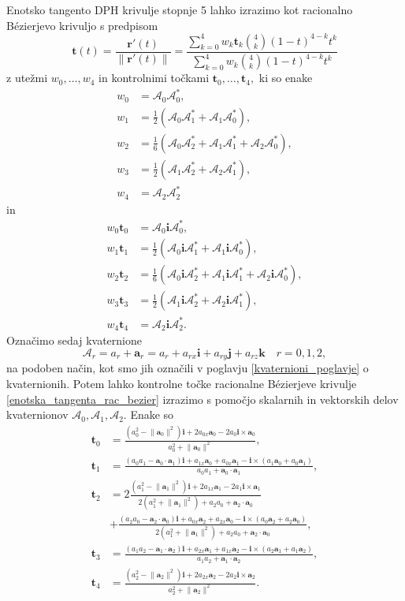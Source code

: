\documentclass[12pt,a4paper,twoside]{article}
\theoremstyle{definition} %
\theoremstyle{plain} %
\theoremstyle{primerstyle}
\numberwithin{equation}{section}  %
\newcommand{\tV}{\mathbf{t}}
\newcommand{\aV}{\mathbf{a}}
\newcommand{\rV}{\mathbf{r}}
\newcommand{\iV}{\mathbf{i}}
\newcommand{\jV}{\mathbf{j}}
\newcommand{\kV}{\mathbf{k}}
\newcommand{\AQ}{\mathcal{A}}
\begin{document}
Enotsko tangento DPH krivulje stopnje 5 lahko izrazimo kot racionalno Bézierjevo krivuljo s predpisom
\begin{equation}
	\label{enotska_tangenta_rac_bezier}
	\tV(t)=\frac{\rV'(t)}{\lVert\rV'(t)\rVert}=\frac{\sum_{k=0}^4w_k\tV_k\binom{4}{k}(1-t)^{4-k}t^k}{\sum_{k=0}^4w_k\binom{4}{k}(1-t)^{4-k}t^k}
\end{equation}
z utežmi $w_0,\dots,w_4$ in kontrolnimi točkami $\tV_0,\dots,\tV_4,$ ki so enake
\begin{align}
	\label{utezi_tangenta}
	w_0&=\AQ_0\AQ_0^*,\nonumber\\
	w_1&=\frac{1}{2}(\AQ_0\AQ_1^*+\AQ_1\AQ_0^*),\nonumber\\
	w_2&=\frac{1}{6}(\AQ_0\AQ_2^*+\AQ_1\AQ_1^*+\AQ_2\AQ_0^*),\\
	w_3&=\frac{1}{2}(\AQ_1\AQ_2^*+\AQ_2\AQ_1^*),\nonumber\\
	w_4&=\AQ_2\AQ_2^*\nonumber
\end{align}
in
\begin{align}
	\label{utezene_kontrolne_tangenta}
	w_0\tV_0&=\AQ_0\iV\AQ_0^*,\nonumber\\
	w_1\tV_1&=\frac{1}{2}(\AQ_0\iV\AQ_1^*+\AQ_1\iV\AQ_0^*),\nonumber\\
	w_2\tV_2&=\frac{1}{6}(\AQ_0\iV\AQ_2^*+\AQ_1\iV\AQ_1^*+\AQ_2\iV\AQ_0^*),\\
	w_3\tV_3&=\frac{1}{2}(\AQ_1\iV\AQ_2^*+\AQ_2\iV\AQ_1^*),\nonumber\\
	w_4\tV_4&=\AQ_2\iV\AQ_2^*.\nonumber
\end{align}
Označimo sedaj kvaternione
\begin{equation}
	\label{hermit_kvaternioni}
	\AQ_r=a_r+\aV_r=a_r+a_{rx}\iV+a_{ry}\jV+a_{rz}\kV\quad r=0,1,2,
\end{equation}
na podoben način, kot smo jih označili v poglavju \ref{kvaternioni_poglavje} o kvaternionih. Potem lahko kontrolne točke racionalne Bézierjeve krivulje \eqref{enotska_tangenta_rac_bezier} izrazimo s pomočjo skalarnih in vektorskih delov kvaternionov $\AQ_0,\AQ_1,\AQ_2.$ Enake so
\begin{align}
	\label{kontrolne_tangenta}
	\tV_0&=\frac{(a_0^2-\lVert\aV_0\rVert^2)\iV+2a_{0x}\aV_0-2a_0\iV\times\aV_0}{a_0^2+\lVert\aV_0\rVert^2},\nonumber\\
	\tV_1&=\frac{(a_0a_1-\aV_0\cdot\aV_1)\iV+a_{1x}\aV_0+a_{0x}\aV_1-\iV\times(a_1\aV_0+a_0\aV_1)}{a_0a_1+\aV_0\cdot\aV_1},\nonumber\\
	\tV_2&=2\frac{(a_1^2-\lVert\aV_1\rVert^2)\iV+2a_{1x}\aV_1-2a_1\iV\times\aV_1}{2(a_1^2+\lVert\aV_1\rVert^2)+a_2a_0+\aV_2\cdot\aV_0}\nonumber\\
	&+\frac{(a_2a_0-\aV_2\cdot\aV_0)\iV+a_{0x}\aV_2+a_{2x}\aV_0-\iV\times(a_0\aV_2+a_2\aV_0)}{2(a_1^2+\lVert\aV_1\rVert^2)+a_2a_0+\aV_2\cdot\aV_0},\\
	\tV_3&=\frac{(a_1a_2-\aV_1\cdot\aV_2)\iV+a_{2x}\aV_1+a_{1x}\aV_2-\iV\times(a_2\aV_1+a_1\aV_2)}{a_1a_2+\aV_1\cdot\aV_2},\nonumber\\
	\tV_4&=\frac{(a_2^2-\lVert\aV_2\rVert^2)\iV+2a_{2x}\aV_2-2a_2\iV\times\aV_2}{a_2^2+\lVert\aV_2\rVert^2}.\nonumber
\end{align}
\end{document}
